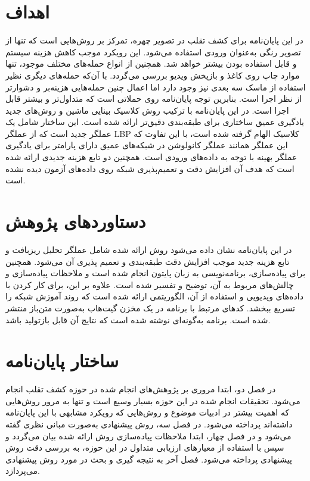 \section{اهداف}
در این پایان‌نامه برای کشف تقلب در تصویر چهره، تمرکز بر روش‌هایی است که تنها از تصویر رنگی به‌عنوان ورودی استفاده می‌شود. این رویکرد موجب کاهش هزینه سیستم و قابل استفاده بودن بیشتر خواهد شد. همچنین از انواع حمله‌های مختلف موجود، تنها موارد چاپ روی کاغذ و بازپخش ویدیو بررسی می‌گردد. با آن‌که حمله‌های دیگری نظیر استفاده از ماسک سه بعدی نیز وجود دارد اما اعمال چنین حمله‌هایی هزینه‌بر و دشوارتر از نظر اجرا است. بنابرین توجه پایان‌نامه روی حملاتی است که متداول‌تر و بیشتر قابل اجرا است. در این پایان‌نامه با ترکیب روش کلاسیک بینایی ماشین و روش‌های جدید یادگیری عمیق ساختاری برای طبقه‌بندی دقیق‌تر ارائه شده است. این ساختار شامل یک عملگر جدید است که از عملگر LBP کلاسیک الهام گرفته شده است، با این تفاوت که این عملگر همانند عملگر کانولوشن در شبکه‌های عمیق دارای پارامتر برای یادگیری عملگر بهینه با توجه به داده‌های ورودی است. همچنین دو تابع هزینه جدیدی ارائه شده است که هدف آن افزایش دقت و تعمیم‌پذیری شبکه روی داده‌های آزمون دیده نشده است.
\section{دستاورد‌های پژوهش}
در این پایان‌نامه نشان داده می‌شود روش ارائه شده شامل عملگر تحلیل ریزبافت و تابع هزینه جدید موجب افزایش دقت طبقه‌بندی و تعمیم پذیری آن می‌شود. همچنین برای پیاده‌سازی، برنامه‌نویسی به زبان پایتون انجام شده است و ملاحظات پیاده‌سازی و چالش‌های مربوط به آن، توضیح و تفسیر شده است. علاوه بر این، برای کار کردن با داده‌های ویدیویی و استفاده از آن، الگوریتمی ارائه شده است که روند آموزش شبکه را تسریع ببخشد. کدهای مرتبط با برنامه در یک مخزن گیت‌هاب
 به‌صورت متن‌باز منتشر شده است. برنامه به‌گونه‌ای نوشته شده است که نتایج آن قابل بازتولید باشد.
\section{ساختار پایان‌نامه}
در فصل دو، ابتدا مروری بر پژوهش‌های انجام شده در حوزه کشف تقلب انجام می‌شود. تحقیقات انجام شده در این حوزه بسیار وسیع است و تنها به مرور روش‌هایی که اهمیت بیشتر در ادبیات موضوع و روش‌هایی که رویکرد مشابهی با این پایان‌نامه داشته‌اند پرداخته می‌شود. در فصل سه، روش پیشنهادی به‌صورت مبانی نظری گفته می‌شود و در فصل چهار، ابتدا ملاحظات پیاده‌سازی روش ارائه شده بیان می‌گردد و سپس با استفاده از معیارهای ارزیابی متداول در این حوزه، به بررسی دقت روش پیشنهادی پرداخته می‌شود. فصل آخر به نتیجه گیری و بحث در مورد روش پیشنهادی می‌پردازد.


